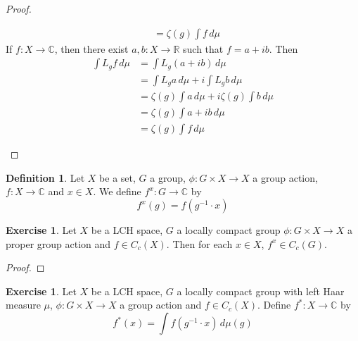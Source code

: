 \documentclass{book}
\theoremstyle{definition}
\newtheorem{defn}[definition]{Definition}
\newtheorem{ex}[definition]{Exercise}
\newcommand{\C}{\mathbb{C}}
\newcommand{\R}{\mathbb{R}}
\DeclareMathOperator*{\0}{\mbf{0}}
\DeclareMathOperator*{\1}{\mbf{1}}
\newcommand{\dmu}{\, d \mu}
\begin{document}
\begin{proof}
\begin{enumerate}
\begin{align*}
			&= \zeta(g) \int f \dmu 
		\end{align*} 
		If $f:X \rightarrow \C$, then there exist $a,b:X \rightarrow \R$ such that $f = a + ib$. Then 
		\begin{align*}
			\int L_g f \dmu
			&= \int L_g(a + i b) \dmu \\
			&= \int L_g a \dmu +i \int L_g b \dmu \\
			&= \zeta(g) \int a \dmu + i \zeta(g) \int b \dmu \\
			&= \zeta(g) \int a + ib \dmu \\
			&= \zeta(g) \int f \dmu 
		\end{align*} 
		\end{enumerate}
	\end{proof}

	\begin{defn}
		Let $X$ be a set, $G$ a group, $\phi: G \times X \rightarrow X$ a group action, $f :X \rightarrow \C$ and $x \in X$. We define $f^x: G \rightarrow \C$ by $$f^x(g) = f(g^{-1} \cdot x)$$
	\end{defn}

	\begin{ex}
		Let $X$ be a LCH space, $G$ a locally compact group $\phi: G \times X \rightarrow X$ a proper group action and $f \in C_c(X)$. Then for each $x \in X$, $f^x \in C_c(G)$.  
	\end{ex}

	\begin{proof}
		
	\end{proof}

	\begin{ex}
		Let $X$ be a LCH space, $G$ a locally compact group with left Haar measure $\mu$, $\phi: G \times X \rightarrow X$ a group action and $f \in C_c(X)$. Define $f^* :X \rightarrow \C$ by $$f^*(x) = \int f(g^{-1} \cdot x) \dmu(g)$$  
	\end{ex}


	
	
	
	
	
	
	
	
	
	
	
	
	
	
	
	
	
	
	
	
	
	
	
	
\end{document}
